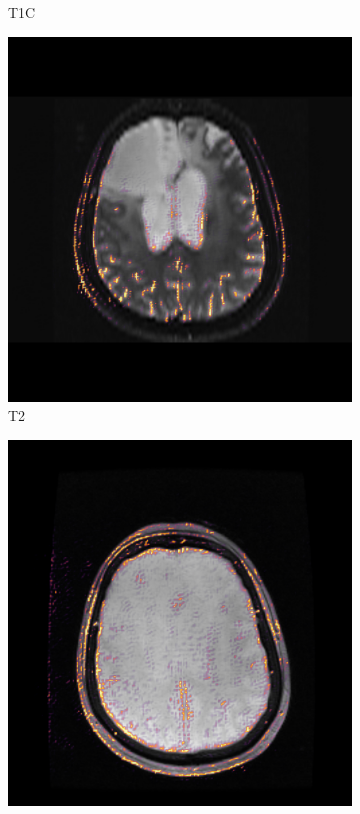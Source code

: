\begin{figure}[htbp]
\begin{subfigure}[t]{\figexamplewidth}
        \caption{\gls{T1C}}\label{fig:T1GDCam}
    \end{subfigure}
    \begin{subfigure}[t]{\figexamplewidth}
        \centering
        \includegraphics[trim={0.5cm 0cm 0.5cm 1cm}, clip,width=\textwidth]{Figures/T2_saliency}
        \caption{\gls{T2}}\label{fig:T2wCam}
    \end{subfigure}
    \begin{subfigure}[t]{\figexamplewidth}
        \centering
        \includegraphics[trim={0.5cm 0cm 0.5cm 1cm}, clip,width=\textwidth]{Figures/PD_saliency}

\end{subfigure}
\end{figure}
